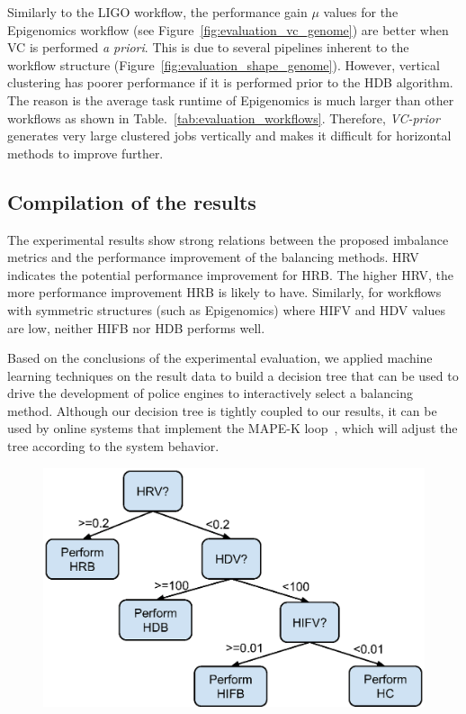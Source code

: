 \documentclass[final,5p,times,twocolumn]{elsarticle}
\begin{document}
Similarly to the LIGO workflow, the performance gain $\mu$ values for the Epigenomics workflow (see Figure~\ref{fig:evaluation_vc_genome}) are better when VC is performed \emph{a priori}. This is due to several pipelines inherent to the workflow structure (Figure~\ref{fig:evaluation_shape_genome}). However, vertical clustering has poorer performance if it is performed prior to the HDB algorithm. The reason is the average task runtime of Epigenomics is much larger than other workflows as shown in Table.~\ref{tab:evaluation_workflows}. Therefore, \emph{VC-prior} generates very large clustered jobs vertically and makes it difficult for horizontal methods to improve further. 


\subsection{Compilation of the results}

The experimental results show strong relations between the proposed imbalance metrics and the performance improvement of the balancing methods. HRV indicates the potential performance improvement for HRB. The higher HRV, the more performance improvement HRB is likely to have. Similarly, for workflows with symmetric structures (such as Epigenomics) where HIFV and HDV values are low, neither HIFB nor HDB performs well.

Based on the conclusions of the experimental evaluation, we applied machine learning techniques on the result data to build a decision tree that can be used to drive the development of police engines to interactively select a balancing method. Although our decision tree is tightly coupled to our results, it can be used by online systems that implement the MAPE-K loop~\cite{daSilva:2013:TFO:2534248.2534254,FerreiradaSilva-CCPE-2014,FerreiradaSilva-FGCS-2013}, which will adjust the tree according to the system behavior.

\begin{figure}[!htb]
	\centering
	\includegraphics[width=1.0\linewidth]{figure29.eps}
	\label{fig:decision_tree}
\end{figure}
\end{document}
